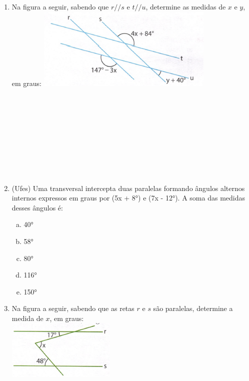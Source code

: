 \documentclass[a4paper,14pt]{article}
\begin{document}
\begin{multicols}{2}
\begin{enumerate}
			\item Na figura a seguir, sabendo que $r // s$ e $t // u$, determine as medidas de $x$ e $y$, em graus:
			\includegraphics[width=1\linewidth]{6FMA144_imagens/imagem10} \\\\\\\\\\\\\\\\\\\\
			\item (Ufes) Uma transversal intercepta duas paralelas formando ângulos alternos internos expressos em graus por (5x + 8°) e (7x - 12°). A soma das medidas desses ângulos é:
			\begin{enumerate}[a)]
				\item 40°
				\item 58°
				\item 80°
				\item 116°
				\item 150° \newpage
			\end{enumerate}
			\item Na figura a seguir, sabendo que as retas $r$ e $s$ são paralelas, determine a medida de $x$, em graus: \\
			\includegraphics[width=1\linewidth]{6FMA144_imagens/imagem11} \\\\\\\\\\\\\\\\\\\\

\end{enumerate}
\end{multicols}
\end{document}
